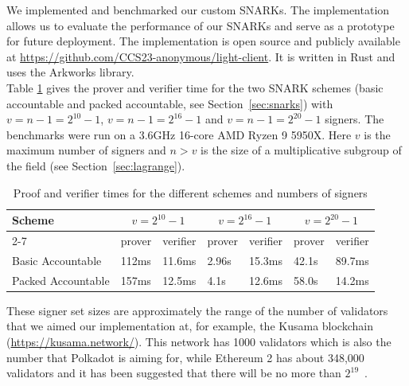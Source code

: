 \noindent We implemented and benchmarked our custom SNARKs. The implementation allows us to evaluate the performance of our SNARKs and serve 
as a prototype for future deployment. The implementation is open source and publicly available at \url{https://github.com/CCS23-anonymous/light-client}. 
It is written in Rust and uses the Arkworks library. \\

\noindent Table \ref{tab:benchmarks} gives the prover and verifier time for the two SNARK schemes (basic accountable and  packed accountable, 
see Section~\ref{sec:snarks}) with $v = n-1 = 2^{10}-1$, $v = n-1 = 2^{16}-1$ and $v=n-1=2^{20}-1$ signers. The benchmarks were run on a 
3.6GHz 16-core AMD Ryzen 9 5950X. Here $v$ is the maximum number of signers and 
$n> v$ is the size of a multiplicative subgroup of the field (see Section~\ref{sec:lagrange}).\\

\begin{table}[h!]
\hfill
\begin{tabular}{| l | l | l | l | l |l | l |}
\hline
 Scheme & \multicolumn{2}{|c|}{$v = 2^{10}-1$} & \multicolumn{2}{|c|}{$v = 2^{16}-1$} & \multicolumn{2}{|c|}{$v = 2^{20}-1$}     \\
\cline{2-7}
 &  prover & verifier & prover & verifier &  prover & verifier \\
\hline

Basic Accountable & 112ms & 11.6ms & 2.96s & 15.3ms & 42.1s & 89.7ms \\
Packed Accountable & 157ms & 12.5ms & 4.1s & 12.6ms & 58.0s & 14.2ms \\
\hline
\end{tabular}
\caption{Proof and verifier times for the different schemes and numbers of signers}
\label{tab:benchmarks}
\end{table}

\noindent These signer set sizes are approximately the range of the number of validators that we aimed our implementation at, for example, 
the Kusama blockchain (\url{https://kusama.network/}). This network has 1000 validators which is also the number that Polkadot is aiming for, 
while Ethereum 2 has about 348,000 validators and it has been suggested that there will be no more than $2^{19}$~\cite{ethresearch1}. \\

